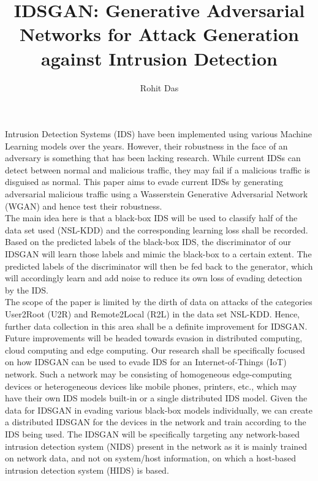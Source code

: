 \documentclass[12pt]{article}
\title{\textbf{IDSGAN: Generative Adversarial Networks for Attack Generation against Intrusion Detection}}
\author{Rohit Das}
\begin{document}
\maketitle

\begin{large}

Intrusion Detection Systems (IDS) have been implemented using various Machine Learning models over the years. However, their robustness in the face of an adversary is something that has been lacking research. While current IDSs can detect between normal and malicious traffic, they may fail if a malicious traffic is disguised as normal. This paper aims to evade current IDSs by generating adversarial malicious traffic using a Wasserstein Generative Adversarial Network (WGAN) and hence test their robustness.\\

The main idea here is that a black-box IDS will be used to classify half of the data set used (NSL-KDD) and the corresponding learning loss shall be recorded. Based on the predicted labels of the black-box IDS, the discriminator of our IDSGAN will learn those labels and mimic the black-box to a certain extent. The predicted labels of the discriminator will then be fed back to the generator, which will accordingly learn and add noise to reduce its own loss of evading detection by the IDS.\\

The scope of the paper is limited by the dirth of data on attacks of the categories User2Root (U2R) and Remote2Local (R2L) in the data set NSL-KDD. Hence, further data collection in this area shall be a definite improvement for IDSGAN. Future improvements will be headed towards evasion in distributed computing, cloud computing and edge computing. Our research shall be specifically focused on how IDSGAN can be used to evade IDS for an Internet-of-Things (IoT) network. Such a network may be consisting of homogeneous edge-computing devices or heterogeneous devices like mobile phones, printers, etc., which may have their own IDS models built-in or a single distributed IDS model. Given the data for IDSGAN in evading various black-box models individually, we can create a distributed IDSGAN for the devices in the network and train according to the IDS being used. The IDSGAN will be specifically targeting any network-based intrusion detection system (NIDS) present in the network as it is mainly trained on network data, and not on system/host information, on which a host-based intrusion detection system (HIDS) is based.

\end{large}
\end{document}

